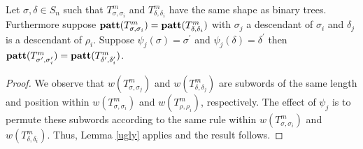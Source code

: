  
\begin{lemma}\label{pr2}
Let $\sigma, \delta \in S_n$ such that $T^m_{\sigma,\sigma_i}$ and $T^m_{\delta,\delta_i}$ have the same shape as binary trees.
Furthermore  suppose ${\bf patt}(T^m_{\sigma,\sigma_i}) = {\bf patt}(T^m_{\delta,\delta_i})$
with $\sigma_j$ a descendant of $\sigma_i$ and $\delta_j$ is a descendant of $\rho_i$.
Suppose $\psi_j(\sigma) = \sigma^\prime$
and $\psi_j(\delta) = \delta^\prime$
then ${\bf patt}(T^m_ {\sigma^\prime,\sigma_i^\prime}) =
 {\bf patt}(T^m_{\delta^\prime,\delta_i^\prime})$.
\end{lemma}
\begin{proof}
We 
observe that $w(T^m_{\sigma,\sigma_j})$ and 
$w(T^m_{\delta,\delta_j})$
are subwords of the same length and position within $w(T^m_{\sigma,\sigma_i})$ and 
$w(T^m_{\rho,\rho_i})$, respectively.  The effect of $\psi_j$ is 
to permute these subwords according to the same rule within
$w(T^m_{\sigma,\sigma_i})$ and 
$w(T^m_{\delta,\delta_i})$. Thus, Lemma \ref{ugly} applies and the 
result follows.
\end{proof}

